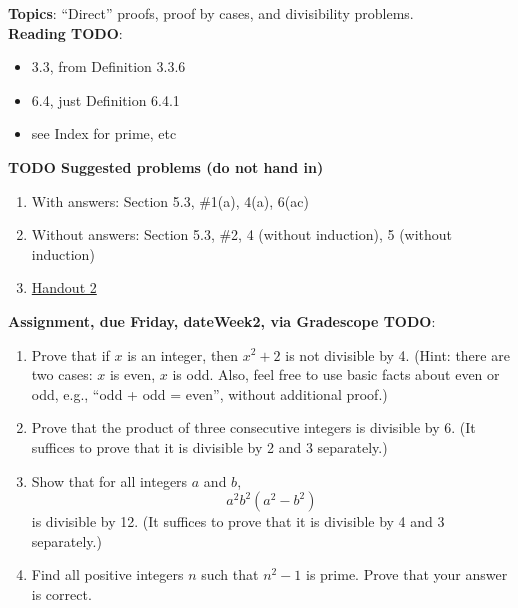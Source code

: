 \documentclass[12pt]{article}
\begin{document}
\textbf{Topics}: ``Direct'' proofs, proof by cases, and divisibility problems. 
\\



\noindent \textbf{Reading TODO}:
\begin{itemize}
\item 3.3, from Definition 3.3.6
\item 6.4, just Definition 6.4.1  
\item see Index for prime, etc
\end{itemize}



\noindent \textbf{TODO Suggested problems (do not hand in)}

\begin{enumerate}
\item With answers: Section 5.3, \#1(a), 4(a), 6(ac)

\item Without answers: Section 5.3, \#2, 4 (without induction), 5 (without induction)

\item \href{https://www.math.emory.edu/~dzb/teaching/250Fall2021/handouts/250-H02-divisibility.pdf}{Handout 2}
\end{enumerate}


\noindent \textbf{Assignment, due Friday, \csname dateWeek2\endcsname, via Gradescope TODO}:

\begin{enumerate}
\item Prove that if $x$ is an integer, then $x^2 + 2$ is not divisible by 4. (Hint: there are two cases: $x$ is even, $x$ is odd. Also, feel free to use basic facts about even or odd, e.g., ``odd + odd = even'', without additional proof.)
\item Prove that the product of three consecutive integers is divisible by 6. (It suffices to prove that it is divisible by 2 and 3 separately.)
\item Show that for all integers $a$ and $b$, 
\[
a^2b^2(a^2 - b^2)
\]
is divisible by 12. (It suffices to prove that it is divisible by 4 and 3 separately.)
\item Find all positive integers $n$ such that $n^2 - 1$ is prime. Prove that your answer is correct.

\end{enumerate}

\newpage
\end{document}
